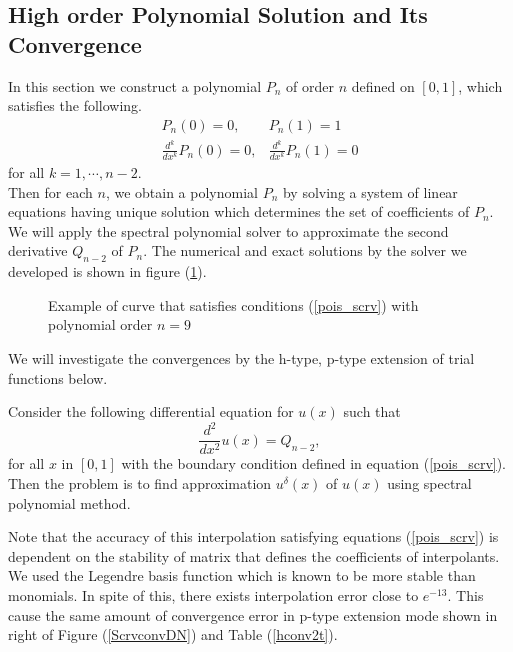 
\subsection {High order Polynomial Solution and Its Convergence}

In this section we construct a polynomial $P_n$ of order $n$ defined on $[0,1]$, which satisfies the following.
\begin{eqnarray}
\label{pois_scrv}
    P_n(0) = 0, &P_n(1) = 1 \\
    \frac{d^k}{dx^k}P_n(0) = 0, &\frac{d^k}{dx^k}P_n(1) = 0
\end{eqnarray}
for all $k = 1, \cdots, n-2$. \\
Then for each $n$, we obtain a polynomial $P_n$ by solving a system of linear equations having unique solution which determines the set of coefficients of $P_n$. We will apply the spectral polynomial solver to approximate the second derivative $Q_{n-2}$ of $P_n$.
The numerical and exact solutions by the solver we developed is shown in figure (\ref{scrvsol}).


\begin{figure}[h]
    \begin{center}
    \caption{\label{scrvsol}Example of curve that satisfies conditions (\ref{pois_scrv}) with polynomial order $n=9$}
    \end{center}
\end{figure}
We will investigate the convergences by the h-type, p-type extension of trial functions below.

\begin{problem}
Consider the following differential equation for $u(x)$ such that
\begin{equation}
\label{poi_poly}
    \frac{d^2}{dx^2} u(x) = Q_{n-2},
\end{equation}
for all $x$ in $[0, 1]$ with the boundary condition defined in equation (\ref{pois_scrv}). Then the problem is to find approximation $u^{\delta}(x)$ of $u(x)$ using spectral polynomial method.
\end{problem}

Note that the accuracy of this interpolation satisfying equations (\ref{pois_scrv}) is dependent on the stability of matrix that defines the coefficients of interpolants. We used the Legendre basis function which is known to be more stable than monomials. In spite of this, there exists interpolation error close to $e^{-13}$. This cause the same amount of convergence error in p-type extension mode shown in right of Figure (\ref{ScrvconvDN}) and Table (\ref{hconv2t}).

